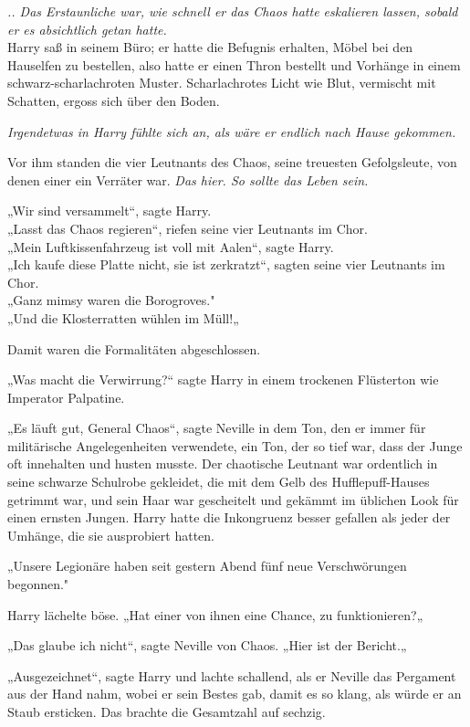 {\emph{.. Das Erstaunliche war, wie schnell er das Chaos hatte eskalieren lassen, sobald er es absichtlich getan hatte.}\\ Harry saß in seinem Büro; er hatte die Befugnis erhalten, Möbel bei den Hauselfen zu bestellen, also hatte er einen Thron bestellt und Vorhänge in einem schwarz-scharlachroten Muster. Scharlachrotes Licht wie Blut, vermischt mit Schatten, ergoss sich über den Boden.

\emph{Irgendetwas in Harry fühlte sich an, als wäre er endlich nach Hause gekommen.}

Vor ihm standen die vier Leutnants des Chaos, seine treuesten Gefolgsleute, von denen einer ein Verräter war. \emph{Das hier. So sollte das Leben sein.}

„Wir sind versammelt“, sagte Harry.\\ „Lasst das Chaos regieren“, riefen seine vier Leutnants im Chor.\\ „Mein Luftkissenfahrzeug ist voll mit Aalen“, sagte Harry.\\ „Ich kaufe diese Platte nicht, sie ist zerkratzt“, sagten seine vier Leutnants im Chor.\\ „Ganz mimsy waren die Borogroves."\\ „Und die Klosterratten wühlen im Müll!„

Damit waren die Formalitäten abgeschlossen.

„Was macht die Verwirrung?“ sagte Harry in einem trockenen Flüsterton wie Imperator Palpatine.

„Es läuft gut, General Chaos“, sagte Neville in dem Ton, den er immer für militärische Angelegenheiten verwendete, ein Ton, der so tief war, dass der Junge oft innehalten und husten musste. Der chaotische Leutnant war ordentlich in seine schwarze Schulrobe gekleidet, die mit dem Gelb des Hufflepuff-Hauses getrimmt war, und sein Haar war gescheitelt und gekämmt im üblichen Look für einen ernsten Jungen. Harry hatte die Inkongruenz besser gefallen als jeder der Umhänge, die sie ausprobiert hatten.

„Unsere Legionäre haben seit gestern Abend fünf neue Verschwörungen begonnen."

Harry lächelte böse. „Hat einer von ihnen eine Chance, zu funktionieren?„

„Das glaube ich nicht“, sagte Neville von Chaos. „Hier ist der Bericht.„

„Ausgezeichnet“, sagte Harry und lachte schallend, als er Neville das Pergament aus der Hand nahm, wobei er sein Bestes gab, damit es so klang, als würde er an Staub ersticken. Das brachte die Gesamtzahl auf sechzig.

}
